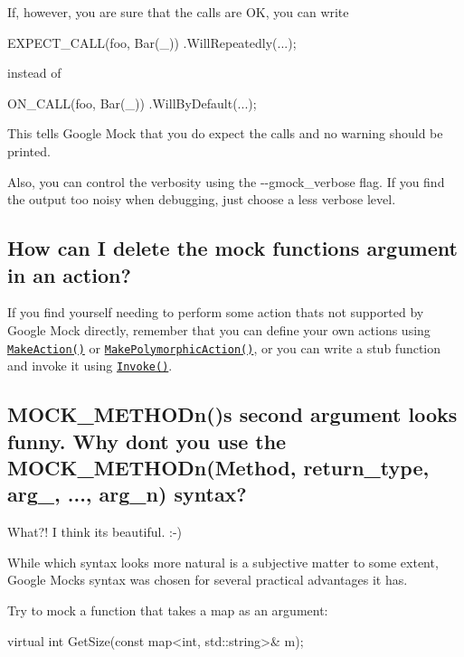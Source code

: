 If, however, you are sure that the calls are OK, you can write


\begin{DoxyCode}
EXPECT\_CALL(foo, Bar(\_))
    .WillRepeatedly(...);
\end{DoxyCode}


instead of


\begin{DoxyCode}
ON\_CALL(foo, Bar(\_))
    .WillByDefault(...);
\end{DoxyCode}


This tells Google Mock that you do expect the calls and no warning should be printed.

Also, you can control the verbosity using the {\ttfamily -\/-\/gmock\+\_\+verbose} flag. If you find the output too noisy when debugging, just choose a less verbose level.

\subsection*{How can I delete the mock function\textquotesingle{}s argument in an action?}

If you find yourself needing to perform some action that\textquotesingle{}s not supported by Google Mock directly, remember that you can define your own actions using \href{CookBook.md#writing-new-actions-quickly}{\tt Make\+Action()} or \href{CookBook.md#writing-new-polymorphic-actions}{\tt Make\+Polymorphic\+Action()}, or you can write a stub function and invoke it using \href{CookBook.md#using-functionsmethodsfunctors-as-actions}{\tt Invoke()}.

\subsection*{M\+O\+C\+K\+\_\+\+M\+E\+T\+H\+O\+Dn()\textquotesingle{}s second argument looks funny. Why don\textquotesingle{}t you use the M\+O\+C\+K\+\_\+\+M\+E\+T\+H\+O\+Dn(Method, return\+\_\+type, arg\+\_, ..., arg\+\_\+n) syntax?}

What?! I think it\textquotesingle{}s beautiful. \+:-\/)

While which syntax looks more natural is a subjective matter to some extent, Google Mock\textquotesingle{}s syntax was chosen for several practical advantages it has.

Try to mock a function that takes a map as an argument\+: 
\begin{DoxyCode}
\textcolor{keyword}{virtual} \textcolor{keywordtype}{int} GetSize(\textcolor{keyword}{const} map<int, std::string>& m);
\end{DoxyCode}


